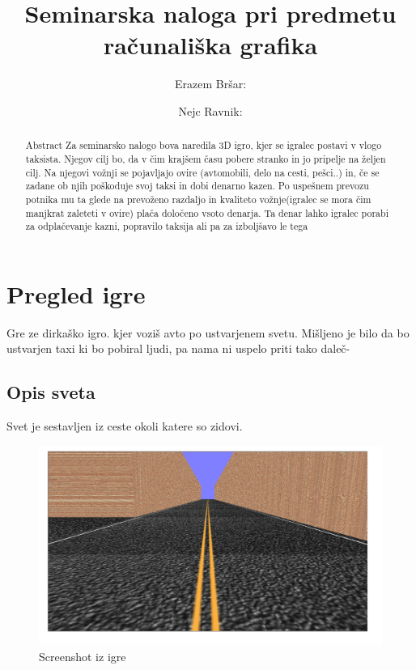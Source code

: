 \documentclass[a4paper]{article}
\begin{document}
\title{Seminarska naloga pri predmetu računališka grafika}

\author{ \large {Erazem Bršar}:  
	\and \hspace*{-3em} \large{ Nejc Ravnik}:   } 

\maketitle


\begin{abstract}{Abstract}
	Za seminarsko nalogo bova naredila 3D igro, kjer se igralec postavi v vlogo taksista. Njegov cilj bo, da v čim krajšem času pobere stranko in jo pripelje na željen cilj. Na njegovi vožnji se pojavljajo ovire (avtomobili, delo na cesti, pešci..) in, če se zadane ob njih poškoduje svoj taksi in dobi denarno kazen. Po uspešnem prevozu potnika mu ta glede na prevoženo razdaljo in kvaliteto vožnje(igralec se mora čim manjkrat zaleteti v ovire) plača določeno vsoto denarja. Ta denar lahko igralec porabi za odplačevanje kazni, popravilo taksija ali pa za izboljšavo le tega\end{abstract}



\section{Pregled igre}
Gre ze dirkaško igro. kjer voziš avto po ustvarjenem svetu. Mišljeno je bilo da bo ustvarjen taxi ki bo pobiral ljudi, pa nama ni uspelo priti tako daleč-

\subsection{Opis sveta}
Svet je sestavljen iz ceste okoli katere so zidovi.
\begin{figure}[!htb]
	\begin{center}
		\includegraphics[width=\columnwidth]{ozadje.png}
		\caption{Screenshot iz igre} \label{fig:slika}
	\end{center}
\end{figure}
\end{document}
